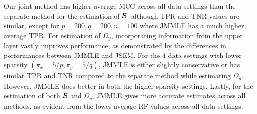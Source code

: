 Our joint method has higher average MCC across all data settings than the separate method for the estimation of ${\cal{B}}$, although TPR and TNR values are similar, except for $p=200, q=200, n=100$ where JMMLE has a much higher average TPR. For estimation of $\Omega_y$, incorporating information from the upper layer vastly improves performance, as demonstrated by the differences in performances between JMMLE and JSEM. For the 4 data settings with lower sparsity $(\pi_x = 5/p, \pi_y = 5/q)$, JMMLE is either slightly conservative or has similar TPR and TNR compared to the separate method while estimating $\Omega_y$. However, JMMLE does better in both the higher sparsity settings. Lastly, for the estimation of both ${\cal{B}}$ and $\Omega_y$, JMMLE gives more accurate estimates across all methods, as evident from the lower average RF values across all data settings.
%

